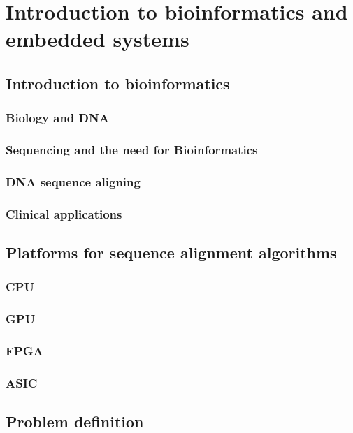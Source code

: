 
\chapter{Introduction to bioinformatics and embedded systems}

\section{Introduction to bioinformatics}

\subsection{Biology and DNA}
\subsection{Sequencing and the need for Bioinformatics}
\subsection{DNA sequence aligning}
\subsection{Clinical applications}

\section{Platforms for sequence alignment algorithms}

\subsection{CPU}
\subsection{GPU}
\subsection{FPGA}
\subsection{ASIC}

\section{Problem definition}